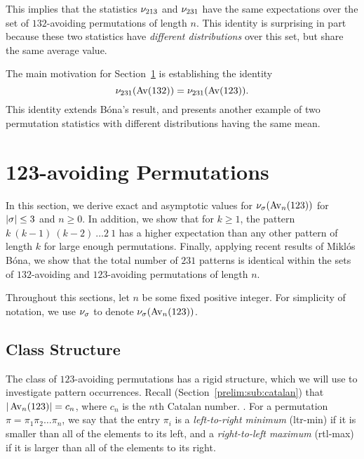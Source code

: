     This implies that the statistics  $\nu_{213}$ and
    $\nu_{231}$ have the same expectations  over the set of
    $132$-avoiding permutations of length $n$. This identity is surprising in part because
    these two statistics have \emph{different distributions} over this set, but
    share the same average value. 

    The main motivation for Section~\ref{expat:av123} is establishing the
    identity 
    $$\nu_{231}(\operatorname{{Av}}(132)) = \nu_{231}(\operatorname{{Av}}(123)).$$
    This identity extends B\'ona's result, and presents another example of two
    permutation statistics with different distributions having the same mean. 


    

\section{123-avoiding Permutations}
\label{expat:av123}

    In this section, we derive exact and asymptotic values for $\nu_\sigma
    (\operatorname{{Av}}_n(123))$ for $|\sigma| \leq 3$ and $n \geq 0$. In addition, we show that
    for $k \geq 1$, the pattern $k\ (k-1)\ (k-2)\ \dots 2\ 1$ has a higher
    expectation than any other pattern of length $k$ for large enough permutations. 
    Finally, applying recent results of Mikl\'os B\'ona, we show that 
    the total number of $231$ patterns is identical within the sets of
    $132$-avoiding and $123$-avoiding permutations of length $n$. 


    Throughout this sections, let $n$ be some fixed positive integer. For
    simplicity of notation, we use $\nu_\sigma$ to denote $\nu_\sigma (\operatorname{{Av}}_n(123))$. 
     

  \subsection{Class Structure}

    The class of $123$-avoiding permutations has a rigid structure, which we will
    use to investigate pattern occurrences. 
    Recall (Section~\ref{prelim:sub:catalan}) that $|\operatorname{{Av}}_n(123)| = c_n$, where $c_n$
    is the $n$th Catalan number.  .  For a permutation
    $\pi = \pi_1 \pi_2 \dots \pi_n$, we say that the entry $\pi_i$ is a
    \emph{left-to-right minimum} (ltr-min)  if it
    is smaller than all of the elements to its left, and a \emph{right-to-left
    maximum} (rtl-max)  if it is larger than all of
    the elements to its right. 
    
